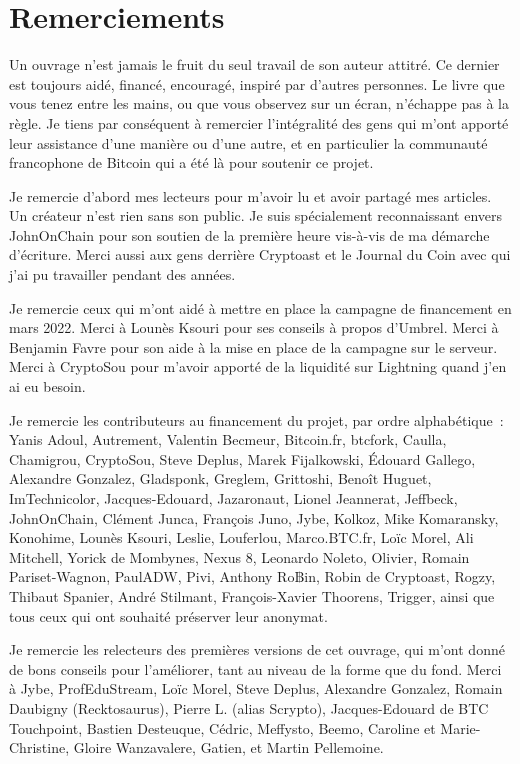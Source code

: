 
\chapter*{Remerciements}

Un ouvrage n'est jamais le fruit du seul travail de son auteur attitré. Ce dernier est toujours aidé, financé, encouragé, inspiré par d'autres personnes. Le livre que vous tenez entre les mains, ou que vous observez sur un écran, n'échappe pas à la règle. Je tiens par conséquent à remercier l'intégralité des gens qui m'ont apporté leur assistance d'une manière ou d'une autre, et en particulier la communauté francophone de Bitcoin qui a été là pour soutenir ce projet.

Je remercie d'abord mes lecteurs pour m'avoir lu et avoir partagé mes articles. Un créateur n'est rien sans son public. Je suis spécialement reconnaissant envers JohnOnChain pour son soutien de la première heure vis-à-vis de ma démarche d'écriture. Merci aussi aux gens derrière Cryptoast et le Journal du Coin avec qui j'ai pu travailler pendant des années.

Je remercie ceux qui m'ont aidé à mettre en place la campagne de financement en mars 2022. Merci à Lounès Ksouri pour ses conseils à propos d'Umbrel. Merci à Benjamin Favre pour son aide à la mise en place de la campagne sur le serveur. Merci à CryptoSou pour m'avoir apporté de la liquidité sur Lightning quand j'en ai eu besoin.

Je remercie les contributeurs au financement du projet, par ordre alphabétique~: Yanis Adoul, Autrement, Valentin Becmeur, Bitcoin.fr, btcfork, Caulla, Chamigrou, CryptoSou, Steve Deplus, Marek Fijalkowski, Édouard Gallego, Alexandre Gonzalez, Gladsponk, Greglem, Grittoshi, Benoît Huguet, ImTechnicolor, Jacques-Edouard, Jazaronaut, Lionel Jeannerat, Jeffbeck, JohnOnChain, Clément Junca, François Juno, Jybe, Kolkoz, Mike Komaransky, Konohime, Lounès Ksouri, Leslie, Louferlou, Marco.BTC.fr, Loïc Morel, Ali Mitchell, Yorick de Mombynes, Nexus 8, Leonardo Noleto, Olivier, Romain Pariset-Wagnon, PaulADW, Pivi, Anthony Ro฿in, Robin de Cryptoast, Rogzy, Thibaut Spanier, André Stilmant, François-Xavier Thoorens, Trigger, ainsi que tous ceux qui ont souhaité préserver leur anonymat.

Je remercie les relecteurs des premières versions de cet ouvrage, qui m'ont donné de bons conseils pour l'améliorer, tant au niveau de la forme que du fond. Merci à Jybe, ProfEduStream, Loïc Morel, Steve Deplus, Alexandre Gonzalez, Romain Daubigny (Recktosaurus), Pierre L. (alias Scrypto), Jacques-Edouard de BTC Touchpoint, Bastien Desteuque, Cédric, Meffysto, Beemo, Caroline et Marie-Christine, Gloire Wanzavalere, Gatien, et Martin Pellemoine.

